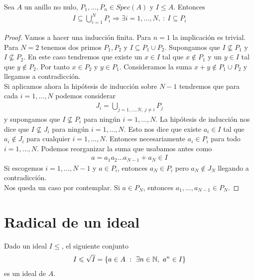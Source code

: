 \begin{prop}
    Sea $A$ un anillo no nulo, $P_1,...,P_n\in Spec(A)$ y $I\leq A$. Entonces
    \begin{gather*}
        I \subseteq \bigcup_{i=1}^N P_i \Rightarrow \exists i = 1,...,N, \ : \ I \subseteq P_i
    \end{gather*}
    \begin{proof}
        Vamos a hacer una inducción finita. Para $n=1$ la implicación es trivial. Para $N=2$ tenemos dos primos $P_1,P_2$ y $I\subseteq P_1\cup P_2$. Supongamos que $I\not\subseteq P_1$  y $I\not\subseteq P_2$. En este caso tendremos que existe un $x\in I$ tal que $x\notin P_1$ y un $y\in I$ tal que $y\notin P_2$. Por tanto $x\in P_2$ y $y\in P_1$. Consideramos la suma $x+y\notin P_1\cup P_2$ y llegamos a contradicción.\\

        Si aplicamos ahora la hipótesis de inducción sobre $N-1$ tendremos que para cada $i=1,...,N$ podemos considerar
        \begin{gather*}
            J_i = \bigcup_{j=1,...,N,\ j\neq i} P_j
        \end{gather*}
        y supongamos que $I\not\subseteq P_i$ para ningún $i=1,...,N$. La hipótesis de inducción nos dice que $I\not\subseteq J_i$ para ningún $i=1,...,N$. Esto nos dice que existe $a_i\in I$ tal que $a_i\notin J_i$ para cualquier $i=1,...,N$. Entonces necesariamente $a_i\in P_i$ para todo $i=1,...,N$. Podemos reorganizar la suma que usabamos antes como
        \begin{gather*}
            a = a_1a_2...a_{N-1} + a_N \in I
        \end{gather*}
        Si escogemos $i=1,...,N-1$ y $a\in P_i$, entonces $a_N\in P_i$ pero $a_N\notin J_N$ llegando a contradicción.\\
        
        Nos queda un caso por contemplar. Si $a\in P_N$, entonces $a_1,...,a_{N-1}\in P_N$. 
    \end{proof}
\end{prop}

\section{Radical de un ideal}

\begin{prop}
    Dado un ideal $I\leq$, el siguiente conjunto
    \begin{gather*}
        I\leqslant \sqrt{I} = \{a\in A \ : \ \exists n \in \mathbb{N},\ a^n\in I\}
    \end{gather*}
    es un ideal de $A$.
\end{prop}

